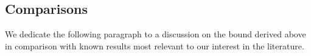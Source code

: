 \documentclass[twoside]{article}
\begin{document}


\subsection{Comparisons}

We dedicate the following paragraph to a discussion on the bound derived above in comparison with known results most relevant to our interest in the literature.
\end{document}
